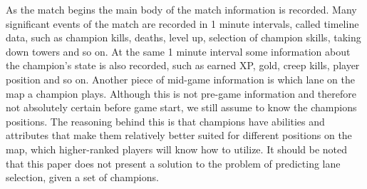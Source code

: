 As the match begins the main body of the match information is recorded. Many significant events of the match are recorded in 1 minute intervals, called timeline data, such as champion kills, deaths, level up, selection of champion skills, taking down towers and so on. At the same 1 minute interval some information about the champion’s state is also recorded, such as earned XP, gold, creep kills, player position and so on. Another piece of mid-game information is which lane on the map a champion plays. Although this is not pre-game information and therefore not absolutely certain before game start, we still assume to know the champions positions. The reasoning behind this is that champions have abilities and attributes that make them relatively better suited for different positions on the map, which higher-ranked players will know how to utilize. It should be noted that this paper does not present a solution to the problem of predicting lane selection, given a set of champions.\\